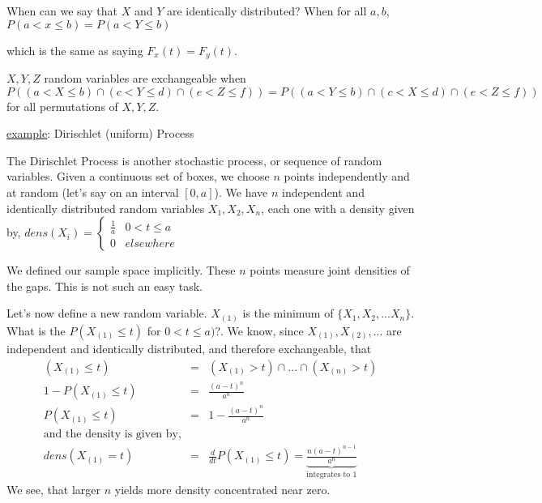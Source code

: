 When can we say that $X$ and $Y$ are identically distributed?  When for all $a, b$, 
$P(a<x\leq b)=P(a<Y\leq b)$

which is the same as saying $F_x(t)=F_y(t)$.  

{$X, Y, Z$ random variables are exchangeable when 
$P((a<X\leq b)\cap(c<Y\leq d)\cap(e<Z\leq f))=P((a<Y\leq b)\cap(c<X\leq d)\cap(e<Z\leq f))$ for all permutations of $X,Y,Z$.}

\underline{example}:  Dirischlet (uniform) Process

The Dirischlet Process is another stochastic process, or sequence of random variables.  Given a continuous set of boxes, we choose $n$ points independently and at random (let's say on an interval $[0,a]$).  We have $n$ independent and identically distributed random variables $X_1, X_2, X_n$, each one with a density given by,
$dens(X_i)= \left\{ \begin{array} {ll} \frac{1}{a} & 0<t\leq a\\0 & elsewhere\end{array} \right. $

We defined our sample space implicitly.  These $n$ points measure joint densities of the gaps.  This is not such an easy task.

Let's now define a new random variable.  $X_{(1)}$ is the minimum of $\lbrace{X_1, X_2,...X_n\rbrace}$.  What is the $P(X_{(1)} \leq t)$ for $0<t\leq a)$?.  We know, since $X_{(1)},X_{(2)},...$ are independent and identically distributed, and therefore exchangeable, that
\begin{eqnarray*}
(X_{(1)}\leq t) &=& (X_{(1)}>t)\cap...\cap(X_{(n)}>t) \\
1-P(X_{(1)}\leq t) &=& \frac{(a-t)^n}{a^n} \\
P(X_{(1)}\leq t) &=& 1-\frac{(a-t)^n}{a^n} \\
\mbox{and the density is given by,} \\
dens(X_{(1)}=t) &=& \frac{d}{dt}P(X_{(1)}\leq t)=\underbrace{\frac{n(a-t)^{n-1}}{a^n}}_{\mbox{integrates to 1}}
\end{eqnarray*}
We see, that larger $n$ yields more density concentrated near zero.

